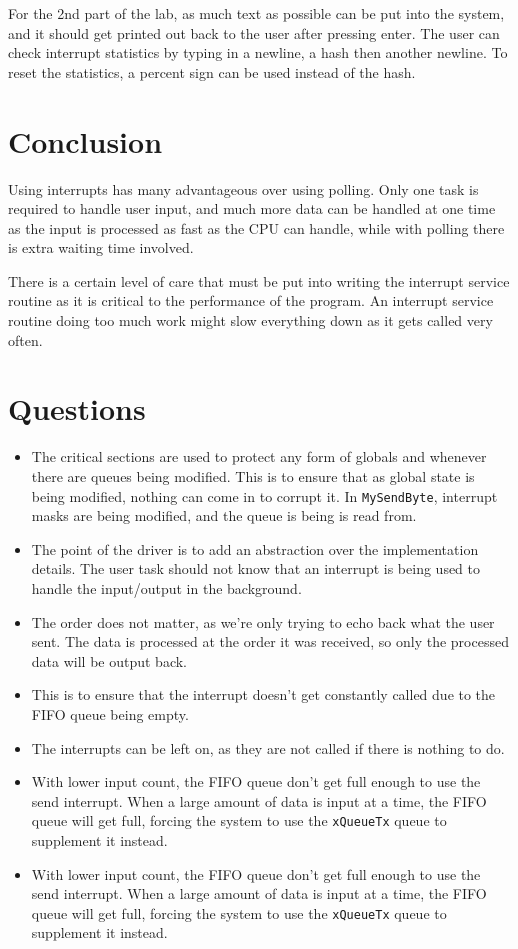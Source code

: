 \documentclass{article}
\begin{document}
For the 2nd part of the lab, as much text as possible can be put into the system, and it should get printed out back to the user after pressing enter. The user can check interrupt statistics by typing in a newline, a hash then another newline. To reset the statistics, a percent sign can be used instead of the hash.

\section{Conclusion}
Using interrupts has many advantageous over using polling. Only one task is required to handle user input, and much more data can be handled at one time as the input is processed as fast as the CPU can handle, while with polling there is extra waiting time involved.

There is a certain level of care that must be put into writing the interrupt service routine as it is critical to the performance of the program. An interrupt service routine doing too much work might slow everything down as it gets called very often.

\section{Questions}
\begin{itemize}
    \item The critical sections are used to protect any form of globals and whenever there are queues being modified. This is to ensure that as global state is being modified, nothing can come in to corrupt it. In \verb|MySendByte|, interrupt masks are being modified, and the queue is being is read from. 
    \item The point of the driver is to add an abstraction over the implementation details. The user task should not know that an interrupt is being used to handle the input/output in the background.
    \item The order does not matter, as we're only trying to echo back what the user sent. The data is processed at the order it was received, so only the processed data will be output back.
    \item This is to ensure that the interrupt doesn't get constantly called due to the FIFO queue being empty.
    \item The interrupts can be left on, as they are not called if there is nothing to do.
    \item With lower input count, the FIFO queue don't get full enough to use the send interrupt. When a large amount of data is input at a time, the FIFO queue will get full, forcing the system to use the \verb|xQueueTx| queue to supplement it instead.
    \item With lower input count, the FIFO queue don't get full enough to use the send interrupt. When a large amount of data is input at a time, the FIFO queue will get full, forcing the system to use the \verb|xQueueTx| queue to supplement it instead.
\end{itemize}
\newpage
\appendix
\end{document}
